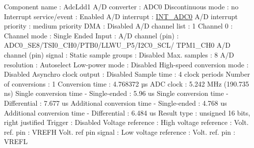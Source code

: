 \begin{DoxyCode}
            Component name                                 : AdcLdd1
            A/D converter                                  : ADC0
            Discontinuous mode                             : no
            Interrupt service/event                        : Enabled
              A/D interrupt                                : \hyperlink{group___interrupt__vector__numbers_gga5f3656e2a154b64aa378a2f3856c3a8dadc0bb741cef921ebacfbc9105c85097b}{INT\_ADC0}
              A/D interrupt priority                       : medium priority
            DMA                                            : Disabled
            A/D channel list                               : 1
              Channel 0                                    : 
                Channel mode                               : Single Ended
                  Input                                    : 
                    A/D channel (pin)                      : ADC0\_SE8/TSI0\_CH0/PTB0/LLWU\_P5/I2C0\_SCL/
      TPM1\_CH0
                    A/D channel (pin) signal               : 
            Static sample groups                           : Disabled
            Max. samples                                   : 8
            A/D resolution                                 : Autoselect
            Low-power mode                                 : Disabled
            High-speed conversion mode                     : Disabled
            Asynchro clock output                          : Disabled
            Sample time                                    : 4 clock periods
            Number of conversions                          : 1
            Conversion time                                : 4.768372 µs
            ADC clock                                      : 5.242 MHz (190.735 ns)
            Single conversion time - Single-ended          : 5.96 us
            Single conversion time - Differential          : 7.677 us
            Additional conversion time - Single-ended      : 4.768 us
            Additional conversion time - Differential      : 6.484 us
            Result type                                    : unsigned 16 bits, right justified
            Trigger                                        : Disabled
            Voltage reference                              : 
              High voltage reference                       : 
                Volt. ref. pin                             : VREFH
                Volt. ref pin signal                       : 
              Low voltage reference                        : 
                Volt. ref. pin                             : VREFL

\end{DoxyCode}
